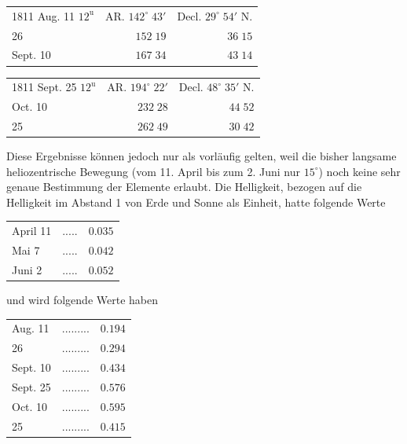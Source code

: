 \begin{center}\fontsize{10}{12}\selectfont\setlength{\tabcolsep}{4pt}\renewcommand{\arraystretch}{1.15}\begin{tabular}{lrr}
1811 Aug. 11 $12^{\text{u}}$ & AR. $142^\circ\;43'$ & Decl. $29^\circ\;54'$ N.\\
26 & $152\;19$ & $36\;15$\\
Sept. 10 & $167\;34$ & $43\;14$\\
\end{tabular}\end{center}

\begin{center}\fontsize{10}{12}\selectfont\setlength{\tabcolsep}{4pt}\renewcommand{\arraystretch}{1.15}\begin{tabular}{lrr}
1811 Sept. 25 $12^{\text{u}}$ & AR. $194^\circ\;22'$ & Decl. $48^\circ\;35'$ N.\\
Oct. 10 & $232\;28$ & $44\;52$\\
25 & $262\;49$ & $30\;42$\\
\end{tabular}\end{center}

\par\indent Diese Ergebnisse können jedoch nur als vorläufig gelten, weil die bisher langsame heliozentrische Bewegung (vom 11. April bis zum 2. Juni nur $15^\circ$) noch keine sehr genaue Bestimmung der Elemente erlaubt. Die Helligkeit, bezogen auf die Helligkeit im Abstand 1 von Erde und Sonne als Einheit, hatte folgende Werte

\begin{center}\fontsize{10}{12}\selectfont\setlength{\tabcolsep}{4pt}\renewcommand{\arraystretch}{1.15}\begin{tabular}{llr}
April 11 & .\;.\;.\;.\;. & $0.035$\\
Mai 7 & .\;.\;.\;.\;. & $0.042$\\
Juni 2 & .\;.\;.\;.\;. & $0.052$\\
\end{tabular}\end{center}

\noindent und wird folgende Werte haben

\begin{center}\fontsize{10}{12}\selectfont\setlength{\tabcolsep}{4pt}\renewcommand{\arraystretch}{1.15}\begin{tabular}{llr}
Aug. 11 & .\;.\;.\;.\;.\;.\;.\;.\;. & $0.194$\\
26 & .\;.\;.\;.\;.\;.\;.\;.\;. & $0.294$\\
Sept. 10 & .\;.\;.\;.\;.\;.\;.\;.\;. & $0.434$\\
Sept. 25 & .\;.\;.\;.\;.\;.\;.\;.\;. & $0.576$\\
Oct. 10 & .\;.\;.\;.\;.\;.\;.\;.\;. & $0.595$\\
25 & .\;.\;.\;.\;.\;.\;.\;.\;. & $0.415$\\
\end{tabular}\end{center}

